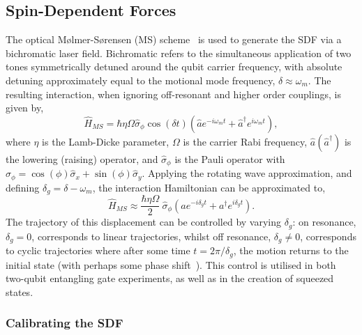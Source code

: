 \subsection{Spin-Dependent Forces}
\label{sec:Spin-Dependent Forces}
    The optical Mølmer-Sørensen (MS) scheme~\cite{sorensen2000entanglement} is used to generate the
    SDF via a bichromatic laser field. Bichromatic refers to the simultaneous
    application of two tones symmetrically detuned around the qubit carrier
    frequency, with absolute detuning approximately equal to the motional mode
    frequency, $\delta \approx \omega_{m}$. The resulting interaction, when
    ignoring off-resonant and higher order couplings, is given by,
    \begin{equation}
        \hat{H}_{MS} = \hbar \eta\Omega\hat{\sigma}_\phi\cos(\delta t) \left( \hat{a} e^{-i\omega_{m} t} + \hat{a}^\dagger e^{i\omega_{m} t} \right),
    \end{equation}
    where $\eta$ is the Lamb-Dicke parameter, $\Omega$ is the carrier Rabi
    frequency, $\hat{a}(\hat{a}^\dagger)$ is the lowering (raising) operator, and
    $\hat{\sigma}_\phi$ is the Pauli operator with $\hat{\sigma}_\phi = \cos(\phi)\hat{\sigma}_x + \sin(\phi)\hat{\sigma}_y$.
    Applying the rotating wave approximation, and defining $\delta_g = \delta -
    \omega_{m}$, the interaction Hamiltonian can be approximated
    to,
    \begin{equation}
        \hat{H}_{MS} \approx \frac{\hbar \eta\Omega}{2}~\hat{\sigma}_\phi \left( a e^{-i\delta_g t} + a^\dagger e^{i\delta_g t} \right).
    \end{equation}
    The trajectory of this displacement can be controlled by varying $\delta_g$: on
    resonance, $\delta_g = 0$, corresponds to linear trajectories, whilst off resonance,
    $\delta_g \neq 0$, corresponds to cyclic trajectories where after some time $t =
    2\pi/\delta_g$, the motion returns to the initial state (with perhaps some phase shift~\cite{haljan2005spin-dependent}). 
    This control is utilised in both two-qubit entangling gate experiments, as well as
    in the creation of squeezed states.\\

\subsubsection{Calibrating the SDF}

